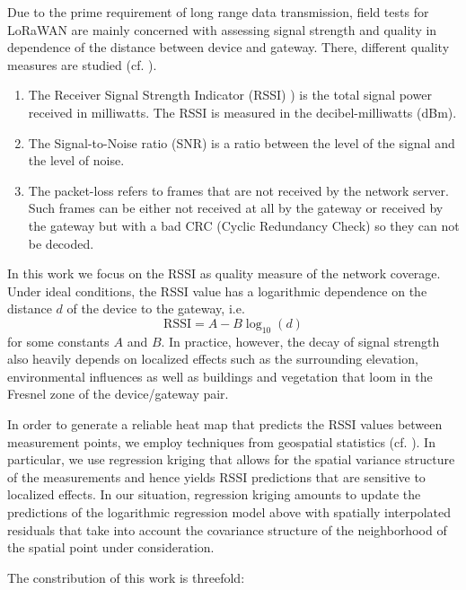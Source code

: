 Due to the prime requirement of long range data transmission, field tests for LoRaWAN are mainly concerned with assessing signal strength and quality in dependence of the distance between device and gateway. There, different quality measures are studied (cf. \cite{Aref2014, Marais2017, }).
\begin{enumerate}
\item The Receiver Signal Strength Indicator (RSSI) ) is the total signal power received in milliwatts. The RSSI  is  measured  in  the  decibel-milliwatts  (dBm).
\item The Signal-to-Noise ratio (SNR) is  a  ratio  between  the  level  of  the  signal  and  the  level  of noise.
\item The packet-loss refers to frames that are not received by the network server. Such frames can be either not received at all by the gateway or received by the gateway but with a bad CRC (Cyclic Redundancy Check) so they can not be decoded.
\end{enumerate}

In this work we focus on the RSSI as quality measure of the network coverage. Under ideal conditions, the RSSI value has a logarithmic dependence on the distance $d$ of the device to the gateway, i.e.
\begin{equation}\label{eqn:loglaw}
\text{RSSI} = A -B \log_{10}(d)
\end{equation}
for some constants $A$ and $B$. In practice, however, the decay of signal strength also heavily depends on localized effects such as the surrounding elevation, environmental influences as well as buildings and vegetation that loom in the Fresnel zone of the device/gateway pair.   

In order to generate a reliable heat map that predicts the RSSI values between measurement points, we employ techniques from geospatial statistics (cf. \cite{Cressi1993, Webster2007}). In particular, we use regression kriging that allows for the spatial variance structure of the measurements and hence yields RSSI predictions that are sensitive to localized effects. In our situation, regression kriging amounts to update the predictions of the logarithmic regression model above with spatially interpolated residuals that take into account the covariance structure of the neighborhood of the spatial point under consideration.  

The constribution of this work is threefold:
\begin{enumerate}

\end{enumerate}





